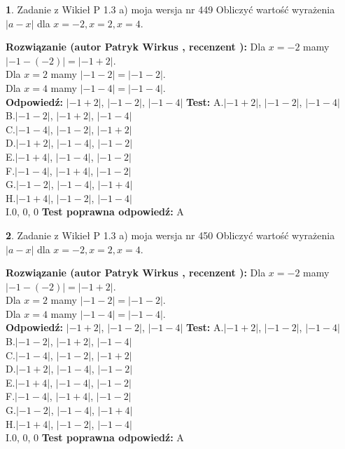 \documentclass[12pt, a4paper]{article}
\theoremstyle{definition} %
\newtheorem{zad}{}
\newcommand{\zadStart}[1]{\begin{zad}#1\newline}
\newcommand{\zadStop}{\end{zad}}
\newcommand{\rozwStart}[2]{\noindent \textbf{Rozwiązanie (autor #1 , recenzent #2): }\newline}
\newcommand{\rozwStop}{\newline}
\newcommand{\odpStart}{\noindent \textbf{Odpowiedź:}\newline}
\newcommand{\odpStop}{\newline}
\newcommand{\testStart}{\noindent \textbf{Test:}\newline}
\newcommand{\testStop}{\newline}
\newcommand{\kluczStart}{\noindent \textbf{Test poprawna odpowiedź:}\newline}
\newcommand{\kluczStop}{\newline}
\begin{document}
\zadStart{Zadanie z Wikieł P 1.3 a) moja wersja nr 449}
Obliczyć wartość wyrażenia $|a - x|$ dla $x=-2,x=2,x=4$.
\zadStop
\rozwStart{Patryk Wirkus}{}
Dla $x = -2$ mamy $|-1 - (-2)| = |-1 + 2|$.\\
Dla $x = 2$ mamy $|-1 - 2| = |-1 - 2|$.\\
Dla $x = 4$ mamy $|-1 - 4| = |-1 - 4|$.\\
\rozwStop
\odpStart
$|-1 + 2|$, $|-1 - 2|$, $|-1 - 4|$
\odpStop
\testStart
A.$|-1 + 2|$, $|-1 - 2|$, $|-1 - 4|$\\
B.$|-1 - 2|$, $|-1 + 2|$, $|-1 - 4|$\\
C.$|-1 - 4|$, $|-1 - 2|$, $|-1 + 2|$\\
D.$|-1 + 2|$, $|-1 - 4|$, $|-1 - 2|$\\
E.$|-1 + 4|$, $|-1 - 4|$, $|-1 - 2|$\\
F.$|-1 - 4|$, $|-1 + 4|$, $|-1 - 2|$\\
G.$|-1 - 2|$, $|-1 - 4|$, $|-1 + 4|$\\
H.$|-1 + 4|$, $|-1 - 2|$, $|-1 - 4|$\\
I.$0$, $0$, $0$
\testStop
\kluczStart
A
\kluczStop



\zadStart{Zadanie z Wikieł P 1.3 a) moja wersja nr 450}
Obliczyć wartość wyrażenia $|a - x|$ dla $x=-2,x=2,x=4$.
\zadStop
\rozwStart{Patryk Wirkus}{}
Dla $x = -2$ mamy $|-1 - (-2)| = |-1 + 2|$.\\
Dla $x = 2$ mamy $|-1 - 2| = |-1 - 2|$.\\
Dla $x = 4$ mamy $|-1 - 4| = |-1 - 4|$.\\
\rozwStop
\odpStart
$|-1 + 2|$, $|-1 - 2|$, $|-1 - 4|$
\odpStop
\testStart
A.$|-1 + 2|$, $|-1 - 2|$, $|-1 - 4|$\\
B.$|-1 - 2|$, $|-1 + 2|$, $|-1 - 4|$\\
C.$|-1 - 4|$, $|-1 - 2|$, $|-1 + 2|$\\
D.$|-1 + 2|$, $|-1 - 4|$, $|-1 - 2|$\\
E.$|-1 + 4|$, $|-1 - 4|$, $|-1 - 2|$\\
F.$|-1 - 4|$, $|-1 + 4|$, $|-1 - 2|$\\
G.$|-1 - 2|$, $|-1 - 4|$, $|-1 + 4|$\\
H.$|-1 + 4|$, $|-1 - 2|$, $|-1 - 4|$\\
I.$0$, $0$, $0$
\testStop
\kluczStart
A
\kluczStop
\end{document}
